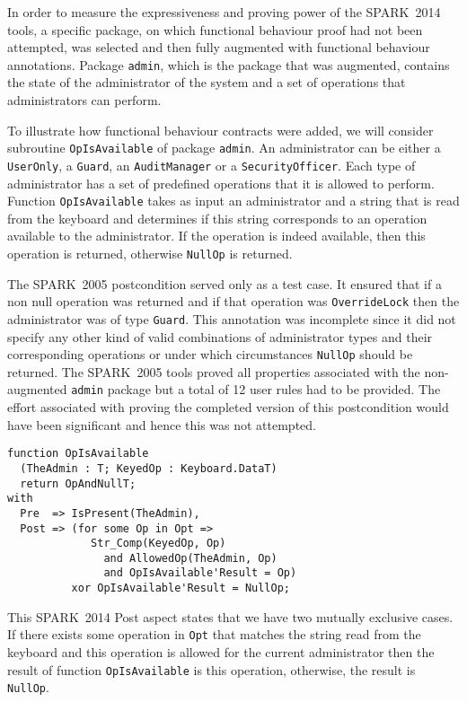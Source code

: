 \documentclass[10pt,a4paper,twocolumn]{article}
\newcommand{\oldspark}{SPARK~2005\xspace}
\newcommand{\newspark}{SPARK~2014\xspace}
\newcommand{\eg}{\textit{e.g.}\xspace}
\newcommand{\SPARK}[1]{\lstinline[language=Ada,basicstyle={\footnotesize
      \sffamily},framesep=0pt]$#1$}
\begin{document}
In order to measure the expressiveness and proving power of the
\newspark tools, a specific package, on which functional behaviour
proof had not been attempted, was selected and then fully augmented
with functional behaviour annotations. Package \SPARK{admin}, which is
the package that was augmented, contains the state of the
administrator of the system and a set of operations that
administrators can perform.

To illustrate how functional behaviour contracts were added, we will
consider subroutine \SPARK{OpIsAvailable} of package \SPARK{admin}. An
administrator can be either a \SPARK{UserOnly}, a \SPARK{Guard}, an
\SPARK{AuditManager} or a \SPARK{SecurityOfficer}. Each type of
administrator has a set of predefined operations that it is allowed to
perform. Function \SPARK{OpIsAvailable} takes as input an
administrator and a string that is read from the keyboard and
determines if this string corresponds to an operation available to the
administrator. If the operation is indeed available, then this
operation is returned, otherwise \SPARK{NullOp} is returned.

The \oldspark postcondition served only as a test case. It
ensured that if a non null operation was returned and if that
operation was \SPARK{OverrideLock} then the administrator was of type
\SPARK{Guard}. This annotation was incomplete since it did not specify
any other kind of valid combinations of administrator types and their
corresponding operations
or under which
circumstances \SPARK{NullOp} should be returned.
The \oldspark tools proved all properties associated with
the non-augmented \SPARK{admin} package but a total of 12 user rules had
to be provided. The
effort associated with proving the completed version of this
postcondition would have been significant and hence this was not attempted.

\begin{lstlisting}
function OpIsAvailable
  (TheAdmin : T; KeyedOp : Keyboard.DataT)
  return OpAndNullT;
with
  Pre  => IsPresent(TheAdmin),
  Post => (for some Op in Opt =>
             Str_Comp(KeyedOp, Op)
               and AllowedOp(TheAdmin, Op)
               and OpIsAvailable'Result = Op)
          xor OpIsAvailable'Result = NullOp;
\end{lstlisting}
This \newspark Post aspect states that we have two mutually
exclusive cases. If there exists some operation in \SPARK{Opt} that
matches the string read from the keyboard and this operation is
allowed for the current administrator then the result of function
\SPARK{OpIsAvailable} is this operation, otherwise, the result is
\SPARK{NullOp}.
\end{document}
